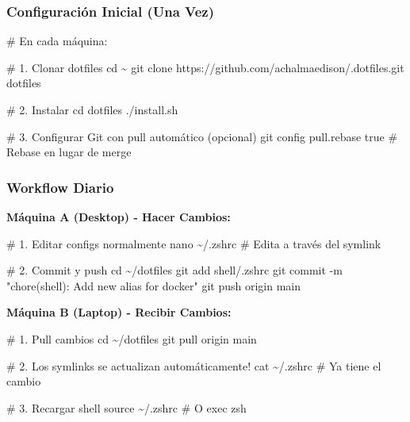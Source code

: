 \documentclass[
  doc,
  floatsintext,
  longtable,
  a4paper,
  nolmodern,
  notxfonts,
  notimes,
  12pt,
  colorlinks=true,linkcolor=blue,citecolor=blue,urlcolor=blue]{apa7}
\newenvironment{Shaded}{\begin{snugshade}}{\end{snugshade}}
\newcommand{\AttributeTok}[1]{\textcolor[rgb]{0.40,0.45,0.13}{#1}}
\newcommand{\BuiltInTok}[1]{\textcolor[rgb]{0.00,0.23,0.31}{#1}}
\newcommand{\CommentTok}[1]{\textcolor[rgb]{0.37,0.37,0.37}{#1}}
\newcommand{\ExtensionTok}[1]{\textcolor[rgb]{0.00,0.23,0.31}{#1}}
\newcommand{\FunctionTok}[1]{\textcolor[rgb]{0.28,0.35,0.67}{#1}}
\newcommand{\NormalTok}[1]{\textcolor[rgb]{0.00,0.23,0.31}{#1}}
\newcommand{\StringTok}[1]{\textcolor[rgb]{0.13,0.47,0.30}{#1}}
\begin{document}
\subsubsection{Configuración Inicial (Una
Vez)}\label{configuraciuxf3n-inicial-una-vez}

\begin{Shaded}
\begin{Highlighting}[]
\CommentTok{\# En cada máquina:}

\CommentTok{\# 1. Clonar dotfiles}
\BuiltInTok{cd}\NormalTok{ \textasciitilde{}}
\FunctionTok{git}\NormalTok{ clone https://github.com/achalmaedison/.dotfiles.git dotfiles}

\CommentTok{\# 2. Instalar}
\BuiltInTok{cd}\NormalTok{ dotfiles}
\ExtensionTok{./install.sh}

\CommentTok{\# 3. Configurar Git con pull automático (opcional)}
\FunctionTok{git}\NormalTok{ config pull.rebase true  }\CommentTok{\# Rebase en lugar de merge}
\end{Highlighting}
\end{Shaded}

\subsubsection{Workflow Diario}\label{workflow-diario-1}

\textbf{Máquina A (Desktop) - Hacer Cambios:}

\begin{Shaded}
\begin{Highlighting}[]
\CommentTok{\# 1. Editar configs normalmente}
\FunctionTok{nano}\NormalTok{ \textasciitilde{}/.zshrc  }\CommentTok{\# Edita a través del symlink}

\CommentTok{\# 2. Commit y push}
\BuiltInTok{cd}\NormalTok{ \textasciitilde{}/dotfiles}
\FunctionTok{git}\NormalTok{ add shell/.zshrc}
\FunctionTok{git}\NormalTok{ commit }\AttributeTok{{-}m} \StringTok{"chore(shell): Add new alias for docker"}
\FunctionTok{git}\NormalTok{ push origin main}
\end{Highlighting}
\end{Shaded}

\textbf{Máquina B (Laptop) - Recibir Cambios:}

\begin{Shaded}
\begin{Highlighting}[]
\CommentTok{\# 1. Pull cambios}
\BuiltInTok{cd}\NormalTok{ \textasciitilde{}/dotfiles}
\FunctionTok{git}\NormalTok{ pull origin main}

\CommentTok{\# 2. Los symlinks se actualizan automáticamente!}
\FunctionTok{cat}\NormalTok{ \textasciitilde{}/.zshrc  }\CommentTok{\# Ya tiene el cambio}

\CommentTok{\# 3. Recargar shell}
\BuiltInTok{source}\NormalTok{ \textasciitilde{}/.zshrc}
\CommentTok{\# O}
\BuiltInTok{exec}\NormalTok{ zsh}
\end{Highlighting}
\end{Shaded}
\end{document}
